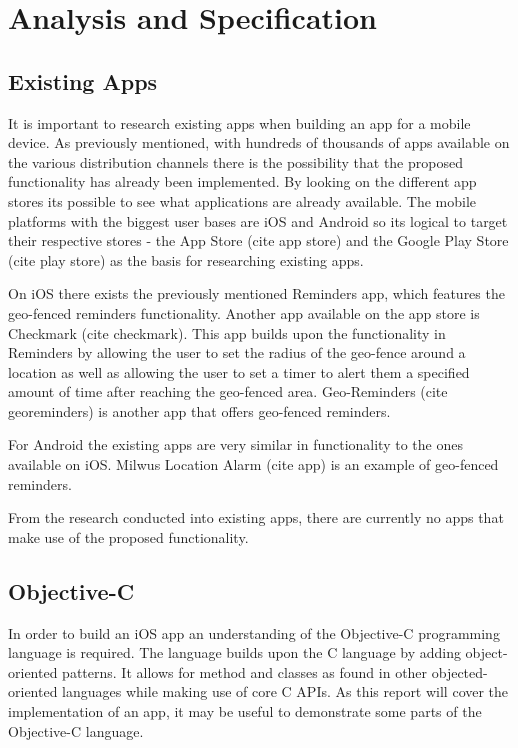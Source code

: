 \documentclass[12pt]{report}
\begin{document}
\section{Analysis and Specification}

\subsection{Existing Apps}

It is important to research existing apps when building an app for a mobile device. As previously mentioned, with hundreds of thousands of apps available on the various distribution channels there is the possibility that the proposed functionality has already been implemented. By looking on the different app stores  its possible to see what applications are already available. The  mobile platforms with the biggest user bases are iOS and Android so its logical to target their respective stores - the App Store  (cite app store) and the Google Play Store (cite play store) as the basis for researching existing apps.

On iOS there exists the previously mentioned Reminders app, which features the geo-fenced reminders functionality. Another app available on the app store is Checkmark (cite checkmark). This app builds upon the functionality in Reminders by allowing the user to set the radius of the geo-fence around a location as well as allowing the user to set a timer to alert them a specified amount of time after reaching the geo-fenced area. Geo-Reminders (cite georeminders) is another app that offers geo-fenced reminders.

For Android the existing apps are very similar in functionality to the ones available on iOS. Milwus Location Alarm (cite app) is an example of geo-fenced reminders.

From the research conducted into existing apps, there are currently no apps that make use of the proposed functionality.

\subsection{Objective-C}

In order to build an iOS app an understanding of the Objective-C programming language is required. The language builds upon the C language by adding object-oriented patterns. It allows for method and classes as found in other objected-oriented languages while making use of core C APIs. As this report will cover the implementation of an app, it may be useful to demonstrate some parts of the Objective-C language. 
\end{document}
